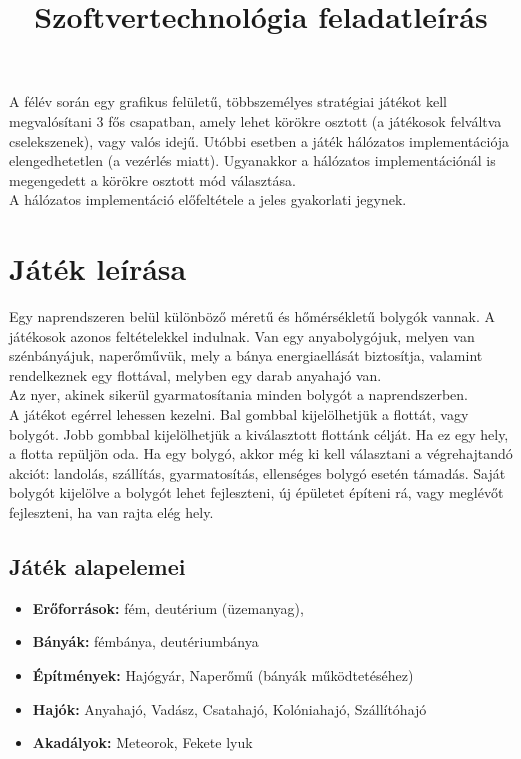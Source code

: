 \documentclass[12pt,a4paper]{article}
\title{Szoftvertechnológia feladatleírás}
\begin{document}
\maketitle
A félév során egy grafikus felületű, többszemélyes stratégiai játékot kell megvalósítani 3 fős csapatban, amely lehet körökre osztott (a játékosok felváltva cselekszenek), vagy valós idejű. Utóbbi esetben a játék hálózatos implementációja elengedhetetlen (a vezérlés miatt). Ugyanakkor a hálózatos implementációnál is megengedett a körökre osztott mód választása. \\

A hálózatos implementáció előfeltétele a jeles gyakorlati jegynek.

\section{Játék leírása}
Egy naprendszeren belül különböző méretű és hőmérsékletű bolygók vannak. A játékosok azonos feltételekkel indulnak. Van egy anyabolygójuk, melyen van szénbányájuk, naperőművük, mely a bánya energiaellását biztosítja, valamint rendelkeznek egy flottával, melyben egy darab anyahajó van. \\

Az nyer, akinek sikerül gyarmatosítania minden bolygót a naprendszerben. \\

A játékot egérrel lehessen kezelni. Bal gombbal kijelölhetjük a flottát, vagy bolygót. Jobb gombbal kijelölhetjük a kiválasztott flottánk célját. Ha ez egy hely, a flotta repüljön oda. Ha egy bolygó, akkor még ki kell választani a végrehajtandó akciót: landolás, szállítás, gyarmatosítás, ellenséges bolygó esetén támadás. Saját bolygót kijelölve a bolygót lehet fejleszteni, új épületet építeni rá, vagy meglévőt fejleszteni, ha van rajta elég hely. \\

\subsection{Játék alapelemei}
\begin{itemize}
\item \textbf{Erőforrások:} fém, deutérium (üzemanyag), 
\item \textbf{Bányák:} fémbánya, deutériumbánya
\item \textbf{Építmények:} Hajógyár, Naperőmű (bányák működtetéséhez)
\item \textbf{Hajók:} Anyahajó, Vadász, Csatahajó, Kolóniahajó, Szállítóhajó
\item \textbf{Akadályok:} Meteorok, Fekete lyuk 
\end{itemize}
\end{document}
